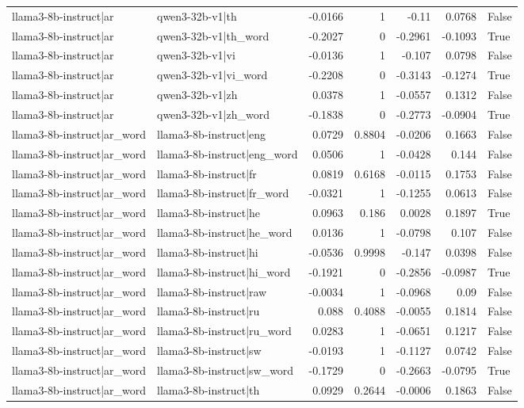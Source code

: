 \begin{table}
\begin{tabular}{l l r r r r l}
llama3-8b-instruct|ar & qwen3-32b-v1|th & -0.0166 & 1 & -0.11 & 0.0768 & False \\
llama3-8b-instruct|ar & qwen3-32b-v1|th_word & -0.2027 & 0 & -0.2961 & -0.1093 & True \\
llama3-8b-instruct|ar & qwen3-32b-v1|vi & -0.0136 & 1 & -0.107 & 0.0798 & False \\
llama3-8b-instruct|ar & qwen3-32b-v1|vi_word & -0.2208 & 0 & -0.3143 & -0.1274 & True \\
llama3-8b-instruct|ar & qwen3-32b-v1|zh & 0.0378 & 1 & -0.0557 & 0.1312 & False \\
llama3-8b-instruct|ar & qwen3-32b-v1|zh_word & -0.1838 & 0 & -0.2773 & -0.0904 & True \\
llama3-8b-instruct|ar_word & llama3-8b-instruct|eng & 0.0729 & 0.8804 & -0.0206 & 0.1663 & False \\
llama3-8b-instruct|ar_word & llama3-8b-instruct|eng_word & 0.0506 & 1 & -0.0428 & 0.144 & False \\
llama3-8b-instruct|ar_word & llama3-8b-instruct|fr & 0.0819 & 0.6168 & -0.0115 & 0.1753 & False \\
llama3-8b-instruct|ar_word & llama3-8b-instruct|fr_word & -0.0321 & 1 & -0.1255 & 0.0613 & False \\
llama3-8b-instruct|ar_word & llama3-8b-instruct|he & 0.0963 & 0.186 & 0.0028 & 0.1897 & True \\
llama3-8b-instruct|ar_word & llama3-8b-instruct|he_word & 0.0136 & 1 & -0.0798 & 0.107 & False \\
llama3-8b-instruct|ar_word & llama3-8b-instruct|hi & -0.0536 & 0.9998 & -0.147 & 0.0398 & False \\
llama3-8b-instruct|ar_word & llama3-8b-instruct|hi_word & -0.1921 & 0 & -0.2856 & -0.0987 & True \\
llama3-8b-instruct|ar_word & llama3-8b-instruct|raw & -0.0034 & 1 & -0.0968 & 0.09 & False \\
llama3-8b-instruct|ar_word & llama3-8b-instruct|ru & 0.088 & 0.4088 & -0.0055 & 0.1814 & False \\
llama3-8b-instruct|ar_word & llama3-8b-instruct|ru_word & 0.0283 & 1 & -0.0651 & 0.1217 & False \\
llama3-8b-instruct|ar_word & llama3-8b-instruct|sw & -0.0193 & 1 & -0.1127 & 0.0742 & False \\
llama3-8b-instruct|ar_word & llama3-8b-instruct|sw_word & -0.1729 & 0 & -0.2663 & -0.0795 & True \\
llama3-8b-instruct|ar_word & llama3-8b-instruct|th & 0.0929 & 0.2644 & -0.0006 & 0.1863 & False \\

\end{tabular}
\end{table}
